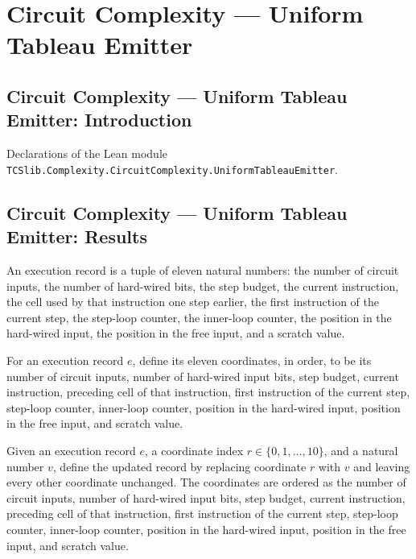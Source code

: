 \section{Circuit Complexity --- Uniform Tableau Emitter}
\subsection*{Circuit Complexity --- Uniform Tableau Emitter: Introduction}

Declarations of the Lean module \texttt{TCSlib.Complexity.CircuitComplexity.UniformTableauEmitter}.

\subsection*{Circuit Complexity --- Uniform Tableau Emitter: Results}

\begin{definition}
\label{Complexity.UTab.ER}
\leanok
An execution record is a tuple of eleven natural numbers: the number of circuit inputs,
the number of hard-wired bits, the step budget, the current instruction, the cell used
by that instruction one step earlier, the first instruction of the current step, the
step-loop counter, the inner-loop counter, the position in the hard-wired input, the
position in the free input, and a scratch value.
\end{definition}

\begin{definition}
\label{Complexity.UTab.ER.f}
\leanok
{}
For an execution record $e$, define its eleven coordinates, in order, to be its number
of circuit inputs, number of hard-wired input bits, step budget, current instruction,
preceding cell of that instruction, first instruction of the current step, step-loop
counter, inner-loop counter, position in the hard-wired input, position in the free
input, and scratch value.
\end{definition}

\begin{definition}
\label{Complexity.UTab.ER.set}
\leanok
{}
Given an execution record $e$, a coordinate index $r\in\{0,1,\ldots,10\}$, and a natural
number $v$, define the updated record by replacing coordinate $r$ with $v$ and leaving
every other coordinate unchanged. The coordinates are ordered as the number of circuit
inputs, number of hard-wired input bits, step budget, current instruction, preceding
cell of that instruction, first instruction of the current step, step-loop counter,
inner-loop counter, position in the hard-wired input, position in the free input, and
scratch value.
\end{definition}

